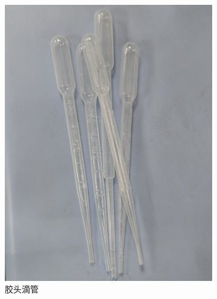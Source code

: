 \documentclass[a4paper]{report} %
\begin{document}
\begin{figure}[H]
    \begin{subfigure}{0.22\textwidth}
        \includegraphics[width=\linewidth]{胶头滴管.jpg}
        \caption{胶头滴管}
    \end{subfigure}
    \begin{subfigure}{0.22\textwidth}

\end{subfigure}
\end{figure}
\end{document}
